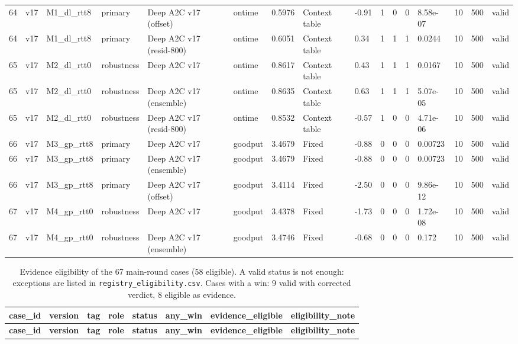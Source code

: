 \documentclass[10pt]{article}
\begin{document}
\begin{landscape}
\begin{longtable}{@{}llllllllllllllll@{}}
64 & v17 & M1\_dl\_rtt8 & primary & Deep A2C v17 (offset) & ontime & 0.5976 & Context table & -0.91 & 1 & 0 & 0 & 8.58e-07 & 10 & 500 & valid \\
64 & v17 & M1\_dl\_rtt8 & primary & Deep A2C v17 (resid-800) & ontime & 0.6051 & Context table & 0.34 & 1 & 1 & 1 & 0.0244 & 10 & 500 & valid \\
65 & v17 & M2\_dl\_rtt0 & robustness & Deep A2C v17 & ontime & 0.8617 & Context table & 0.43 & 1 & 1 & 1 & 0.0167 & 10 & 500 & valid \\
65 & v17 & M2\_dl\_rtt0 & robustness & Deep A2C v17 (ensemble) & ontime & 0.8635 & Context table & 0.63 & 1 & 1 & 1 & 5.07e-05 & 10 & 500 & valid \\
65 & v17 & M2\_dl\_rtt0 & robustness & Deep A2C v17 (resid-800) & ontime & 0.8532 & Context table & -0.57 & 1 & 0 & 0 & 4.71e-06 & 10 & 500 & valid \\
66 & v17 & M3\_gp\_rtt8 & primary & Deep A2C v17 & goodput & 3.4679 & Fixed & -0.88 & 0 & 0 & 0 & 0.00723 & 10 & 500 & valid \\
66 & v17 & M3\_gp\_rtt8 & primary & Deep A2C v17 (ensemble) & goodput & 3.4679 & Fixed & -0.88 & 0 & 0 & 0 & 0.00723 & 10 & 500 & valid \\
66 & v17 & M3\_gp\_rtt8 & primary & Deep A2C v17 (offset) & goodput & 3.4114 & Fixed & -2.50 & 0 & 0 & 0 & 9.86e-12 & 10 & 500 & valid \\
67 & v17 & M4\_gp\_rtt0 & robustness & Deep A2C v17 & goodput & 3.4378 & Fixed & -1.73 & 0 & 0 & 0 & 1.72e-08 & 10 & 500 & valid \\
67 & v17 & M4\_gp\_rtt0 & robustness & Deep A2C v17 (ensemble) & goodput & 3.4746 & Fixed & -0.68 & 0 & 0 & 0 & 0.172 & 10 & 500 & valid \\
\bottomrule
\end{longtable}
\normalsize
\tiny
\setlength{\tabcolsep}{1.6pt}
\begin{longtable}{@{}llllllll@{}}
\caption{Evidence eligibility of the 67 main-round cases (58 eligible). A valid status is not enough: exceptions are listed in \texttt{registry\_eligibility.csv}. Cases with a win: 9 valid with corrected verdict, 8 eligible as evidence.}\\
\toprule
\textbf{case\_id} & \textbf{version} & \textbf{tag} & \textbf{role} & \textbf{status} & \textbf{any\_win} & \textbf{evidence\_eligible} & \textbf{eligibility\_note} \\
\midrule
\endfirsthead
\toprule
\textbf{case\_id} & \textbf{version} & \textbf{tag} & \textbf{role} & \textbf{status} & \textbf{any\_win} & \textbf{evidence\_eligible} & \textbf{eligibility\_note} \\

\end{longtable}
\end{landscape}
\end{document}
